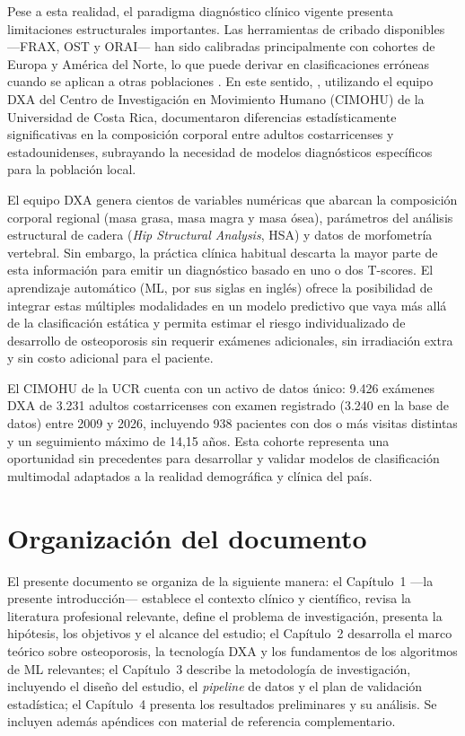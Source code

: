 \documentclass[../tesis.tex]{subfiles}
\begin{document}
Pese a esta realidad, el paradigma diagnóstico clínico vigente presenta limitaciones estructurales importantes. Las herramientas de cribado disponibles ---FRAX\textregistered{}, OST y ORAI--- han sido calibradas principalmente con cohortes de Europa y América del Norte, lo que puede derivar en clasificaciones erróneas cuando se aplican a otras poblaciones \cite{BurnettBowie2024}. En este sentido, \textcite{Moncada2023}, utilizando el equipo DXA del Centro de Investigación en Movimiento Humano (CIMOHU) de la Universidad de Costa Rica, documentaron diferencias estadísticamente significativas en la composición corporal entre adultos costarricenses y estadounidenses, subrayando la necesidad de modelos diagnósticos específicos para la población local.

El equipo DXA genera cientos de variables numéricas que abarcan la composición corporal regional (masa grasa, masa magra y masa ósea), parámetros del análisis estructural de cadera (\textit{Hip Structural Analysis}, HSA) y datos de morfometría vertebral. Sin embargo, la práctica clínica habitual descarta la mayor parte de esta información para emitir un diagnóstico basado en uno o dos T-scores. El aprendizaje automático (ML, por sus siglas en inglés) ofrece la posibilidad de integrar estas múltiples modalidades en un modelo predictivo que vaya más allá de la clasificación estática y permita estimar el riesgo individualizado de desarrollo de osteoporosis sin requerir exámenes adicionales, sin irradiación extra y sin costo adicional para el paciente.

El CIMOHU de la UCR cuenta con un activo de datos único: 9.426 exámenes DXA de 3.231 adultos costarricenses con examen registrado (3.240 en la base de datos) entre 2009 y 2026, incluyendo 938 pacientes con dos o más visitas distintas y un seguimiento máximo de 14{,}15 años. Esta cohorte representa una oportunidad sin precedentes para desarrollar y validar modelos de clasificación multimodal adaptados a la realidad demográfica y clínica del país.

\section{Organización del documento}
\label{outline}

El presente documento se organiza de la siguiente manera: el Capítulo~1 ---la presente introducción--- establece el contexto clínico y científico, revisa la literatura profesional relevante, define el problema de investigación, presenta la hipótesis, los objetivos y el alcance del estudio; el Capítulo~2 desarrolla el marco teórico sobre osteoporosis, la tecnología DXA y los fundamentos de los algoritmos de ML relevantes; el Capítulo~3 describe la metodología de investigación, incluyendo el diseño del estudio, el \textit{pipeline} de datos y el plan de validación estadística; el Capítulo~4 presenta los resultados preliminares y su análisis. Se incluyen además apéndices con material de referencia complementario.
\end{document}
